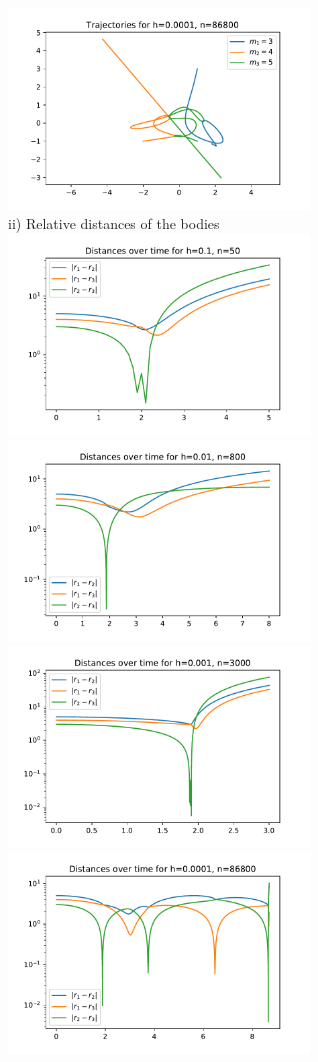 \documentclass[12pt,a4paper]{article}
\begin{document}
\includegraphics[width=8cm]{b_h_0001.pdf}\\
ii) Relative distances of the bodies\\
\includegraphics[width=8cm]{dist_h_1.pdf}
\includegraphics[width=8cm]{dist_h_01.pdf}\\
\includegraphics[width=8cm]{dist_h_001.pdf}
\includegraphics[width=8cm]{dist_h_0001.pdf}\\
\end{document}
